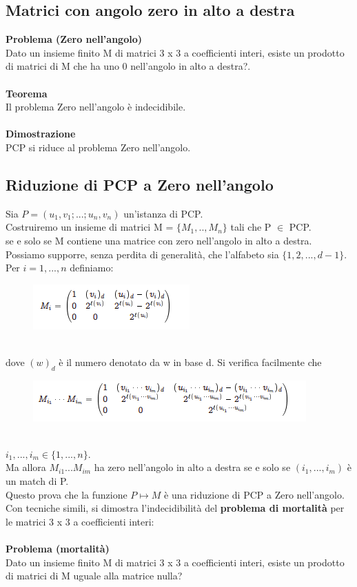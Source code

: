 \subsection{Matrici con angolo zero in alto a destra}
\textbf{Problema (Zero nell’angolo)}\\
Dato un insieme finito M di matrici 3 x 3 a coefficienti interi, esiste un prodotto di matrici di M che ha uno 0 nell’angolo in alto a destra?.\\\\
\textbf{Teorema}\\
Il problema Zero nell’angolo è indecidibile.\\\\
\textbf{Dimostrazione}\\
PCP si riduce al problema Zero nell’angolo.
\newpage
\subsection{Riduzione di PCP a Zero nell’angolo}
Sia $P = (u_1,v_1;...;u_n,v_n)$ un’istanza di PCP.\\
Costruiremo un insieme di matrici M = $\{M_1,.., M_n\}$ tali che P $\in$ PCP.\\
se e solo se M contiene una matrice con zero nell’angolo in alto a destra. \\
Possiamo supporre, senza perdita di generalità, che l’alfabeto sia $\{1, 2, . . . , d - 1\}$.\\
Per $i=1, . . . , n$ definiamo:
\begin{figure}[htp]
    \centering
    \includegraphics[scale=0.9]{tesi_stile/img/cap7f17.png}
\end{figure}\\
dove $(w)_d$ è il numero denotato da w in base d. Si verifica facilmente che
\begin{figure}[htp]
    \centering
    \includegraphics[scale=0.9]{tesi_stile/img/cap7f18.png}
\end{figure}\\
$i_1, . . . , i_m \in \{1, . . . , n\}$.\\
Ma allora $M_{i1}...M_{im}$ ha zero nell’angolo in alto a destra se e solo se $(i_1, . . . , i_m )$ è un match di P.\\
Questo prova che la funzione $P \mapsto M$ è una riduzione di PCP a Zero nell’angolo.\\
Con tecniche simili, si dimostra l’indecidibilità del \textbf{problema di mortalità} per le matrici 3 x 3 a coefficienti interi:\\\\
\textbf{Problema (mortalità)}\\
Dato un insieme finito M di matrici 3 x 3 a coefficienti interi, esiste un prodotto di matrici di M uguale alla matrice nulla?
\newpage

